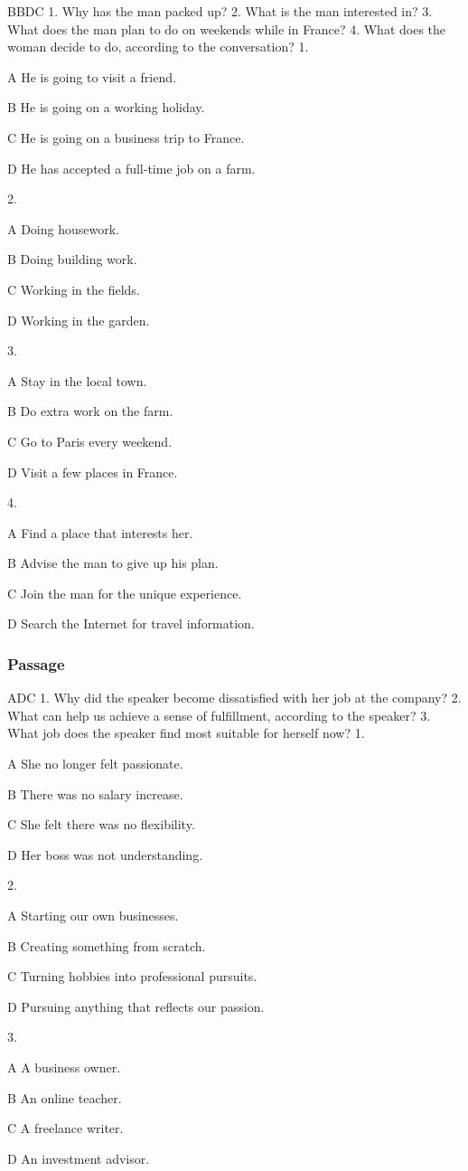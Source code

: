 \begin{enumerate}
	BBDC
	1. Why has the man packed up?
	2. What is the man interested in?
	3. What does the man plan to do on weekends while in France?
	4. What does the woman decide to do, according to the conversation?
	1.
	
	A
	He is going to visit a friend.
	
	B
	He is going on a working holiday.
	
	C
	He is going on a business trip to France.
	
	D
	He has accepted a full-time job on a farm.
	
	2.
	
	A
	Doing housework.
	
	B
	Doing building work.
	
	C
	Working in the fields.
	
	D
	Working in the garden.
	
	3.
	
	A
	Stay in the local town.
	
	B
	Do extra work on the farm.
	
	C
	Go to Paris every weekend.
	
	D
	Visit a few places in France.
	
	4.
	
	A
	Find a place that interests her.
	
	B
	Advise the man to give up his plan.
	
	C
	Join the man for the unique experience.
	
	D
	Search the Internet for travel information.
\end{enumerate}


\subsubsection{Passage}

\begin{enumerate}
	ADC
	1. Why did the speaker become dissatisfied with her job at the company?
	2. What can help us achieve a sense of fulfillment, according to the speaker?
	3. What job does the speaker find most suitable for herself now?
	1.
	
	A
	She no longer felt passionate.
	
	B
	There was no salary increase.
	
	C
	She felt there was no flexibility.
	
	D
	Her boss was not understanding.
	
	2.
	
	A
	Starting our own businesses.
	
	B
	Creating something from scratch.
	
	C
	Turning hobbies into professional pursuits.
	
	D
	Pursuing anything that reflects our passion.
	
	3.
	
	A
	A business owner.
	
	B
	An online teacher.
	
	C
	A freelance writer.
	
	D
	An investment advisor.
\end{enumerate}

